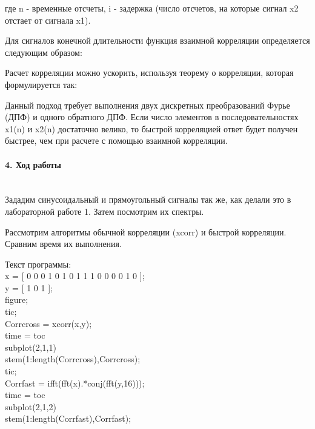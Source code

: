 \documentclass[12pt,a4paper]{report}
\begin{document}
\begin{figure}[h!]
\end{figure}
где n - временные отсчеты, i - задержка (число отсчетов, на которые сигнал x2 отстает от сигнала x1).

Для сигналов конечной длительности функция взаимной корреляции определяется следующим
образом:
\begin{figure}[h!]
\end{figure}
\newpage
Расчет корреляции можно ускорить, используя теорему о корреляции, которая формулируется так:

\begin{figure}[h!]
\end{figure}

Данный подход требует выполнения двух дискретных преобразований Фурье (ДПФ) и одного обратного ДПФ. Если число элементов в последовательностях x1(n) и x2(n) достаточно велико, то быстрой корреляцией
ответ будет получен быстрее, чем при расчете с помощью взаимной корреляции.

\paragraph{4. Ход работы \\\\}
Зададим синусоидальный и прямоугольный сигналы так же, как делали это в лабораторной работе 1. Затем посмотрим их спектры. 

Рассмотрим алгоритмы обычной корреляции (xcorr) и быстрой корреляции. Сравним время их выполнения.

Текст программы:\\
x = [ 0 0 0 1 0 1 0 1 1 1 0 0 0 0 1 0 ];\\
y = [ 1 0 1 ];\\
figure;\\
tic;\\
Corrcross = xcorr(x,y);\\
time = toc\\
subplot(2,1,1)\\
stem(1:length(Corrcross),Corrcross);\\
tic;\\
Corrfast = ifft(fft(x).*conj(fft(y,16)));\\
time = toc\\
subplot(2,1,2)\\
stem(1:length(Corrfast),Corrfast);\\
\end{document}
